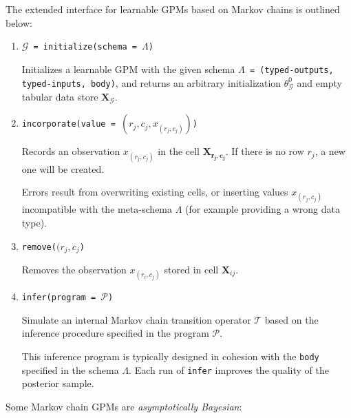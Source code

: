 \documentclass[10pt,letterpaper]{article}
\begin{document}
The extended interface for learnable GPMs based on Markov chains is outlined below:

\begin{enumerate}

\item \texttt{$\mathcal{G}$ = initialize(schema = $\Lambda$)}

    Initializes a learnable GPM with the given schema \texttt{$\Lambda$ = (typed-outputs, typed-inputs, body)}, and returns an arbitrary initialization $\theta_\mathcal{G}^0$ and empty tabular data store $\mathbf{X}_\mathcal{G}$.


\item \texttt{incorporate(value = $(r_j,c_j,x_{(r_j,c_j)})$)}

    Records an observation $x_{(r_j,c_j)}$ in the cell $\mathbf{X_{r_j,c_j}}$. If there is no row $r_j$, a new one will be created.
    
    Errors result from overwriting existing cells, or inserting values $x_{(r_j,c_j)}$ incompatible with the meta-schema $\Lambda$ (for example providing a wrong data type).

\item \texttt{remove($(r_j,c_j$)}

    Removes the observation $x_{(r_i,c_j)}$ stored in cell $\mathbf{X}_{ij}$.

\item \texttt{infer(program = $\mathcal{P}$)}

    Simulate an internal Markov chain transition operator $\mathcal{T}$ based on the inference procedure specified in the program $\mathcal{P}$.
    
    This inference program is typically designed in cohesion with the \texttt{body} specified in the schema $\Lambda$. Each run of \texttt{infer}
    improves the quality of the posterior sample.
\end{enumerate}

Some Markov chain GPMs are \textit{asymptotically Bayesian}:
\end{document}
